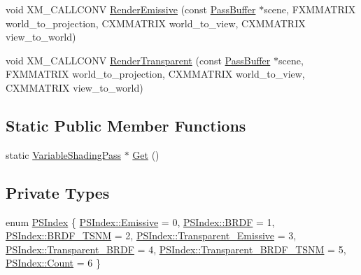 \begin{DoxyCompactItemize}
\item 
void X\+M\+\_\+\+C\+A\+L\+L\+C\+O\+NV \hyperlink{classmage_1_1_variable_shading_pass_a296893e1584331353a63e039021d7f29}{Render\+Emissive} (const \hyperlink{structmage_1_1_pass_buffer}{Pass\+Buffer} $\ast$scene, F\+X\+M\+M\+A\+T\+R\+IX world\+\_\+to\+\_\+projection, C\+X\+M\+M\+A\+T\+R\+IX world\+\_\+to\+\_\+view, C\+X\+M\+M\+A\+T\+R\+IX view\+\_\+to\+\_\+world)
\item 
void X\+M\+\_\+\+C\+A\+L\+L\+C\+O\+NV \hyperlink{classmage_1_1_variable_shading_pass_a61267f8700a4b6c1b308b64c225bcef1}{Render\+Transparent} (const \hyperlink{structmage_1_1_pass_buffer}{Pass\+Buffer} $\ast$scene, F\+X\+M\+M\+A\+T\+R\+IX world\+\_\+to\+\_\+projection, C\+X\+M\+M\+A\+T\+R\+IX world\+\_\+to\+\_\+view, C\+X\+M\+M\+A\+T\+R\+IX view\+\_\+to\+\_\+world)
\end{DoxyCompactItemize}
\subsection*{Static Public Member Functions}
\begin{DoxyCompactItemize}
\item 
static \hyperlink{classmage_1_1_variable_shading_pass}{Variable\+Shading\+Pass} $\ast$ \hyperlink{classmage_1_1_variable_shading_pass_a4c5572071474485e60af17b34539a603}{Get} ()
\end{DoxyCompactItemize}
\subsection*{Private Types}
\begin{DoxyCompactItemize}
\item 
enum \hyperlink{classmage_1_1_variable_shading_pass_a49519e421ac5be93136d9efdbf075d4a}{P\+S\+Index} \{ \newline
\hyperlink{classmage_1_1_variable_shading_pass_a49519e421ac5be93136d9efdbf075d4aa3cb4ee67c41d819920d72fcc11b9b566}{P\+S\+Index\+::\+Emissive} = 0, 
\hyperlink{classmage_1_1_variable_shading_pass_a49519e421ac5be93136d9efdbf075d4aa4e69f1c58994758054563aa7392ffa4c}{P\+S\+Index\+::\+B\+R\+DF} = 1, 
\hyperlink{classmage_1_1_variable_shading_pass_a49519e421ac5be93136d9efdbf075d4aa12126b75c3073e66dcaed7ac43317a00}{P\+S\+Index\+::\+B\+R\+D\+F\+\_\+\+T\+S\+NM} = 2, 
\hyperlink{classmage_1_1_variable_shading_pass_a49519e421ac5be93136d9efdbf075d4aa72d12be64d7b318fe15d5d0c8682feef}{P\+S\+Index\+::\+Transparent\+\_\+\+Emissive} = 3, 
\newline
\hyperlink{classmage_1_1_variable_shading_pass_a49519e421ac5be93136d9efdbf075d4aaeb62f8bcb0bd36fba14e9fe3fcb12805}{P\+S\+Index\+::\+Transparent\+\_\+\+B\+R\+DF} = 4, 
\hyperlink{classmage_1_1_variable_shading_pass_a49519e421ac5be93136d9efdbf075d4aa0cda01fc01db8201f5bee170d74f9771}{P\+S\+Index\+::\+Transparent\+\_\+\+B\+R\+D\+F\+\_\+\+T\+S\+NM} = 5, 
\hyperlink{classmage_1_1_variable_shading_pass_a49519e421ac5be93136d9efdbf075d4aae93f994f01c537c4e2f7d8528c3eb5e9}{P\+S\+Index\+::\+Count} = 6
 \}
\end{DoxyCompactItemize}
